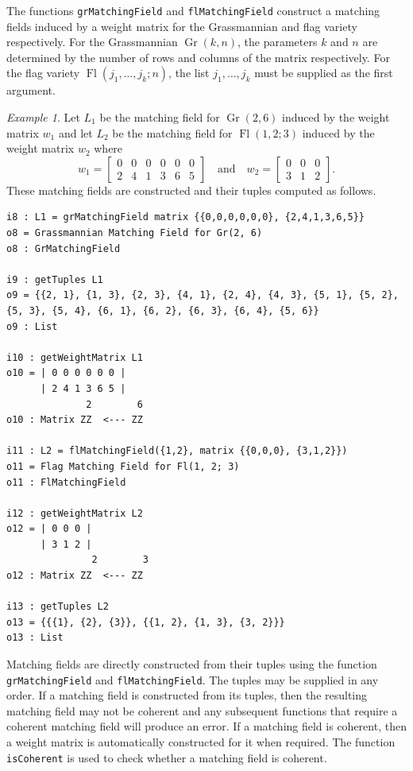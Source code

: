 \documentclass[11pt]{article}
\DeclareMathOperator{\Fl}{Fl}
\DeclareMathOperator{\Gr}{Gr}
\theoremstyle{plain}
\theoremstyle{definition}
\theoremstyle{remark}
\newtheorem{example}[theorem]{Example}
\begin{document}
The functions \texttt{grMatchingField} and \texttt{flMatchingField} construct a matching fields induced by a weight matrix for the Grassmannian and flag variety respectively. For the Grassmannian $\Gr(k,n)$, the parameters $k$ and $n$ are determined by the number of rows and columns of the matrix respectively. For the flag variety $\Fl(j_1, \dots, j_k; n)$, the list $j_1, \dots, j_k$ must be supplied as the first argument.

\begin{example}

Let $L_1$ be the matching field for $\Gr(2, 6)$ induced by the weight matrix $w_1$ and let $L_2$ be the matching field for $\Fl(1,2; 3)$ induced by the weight matrix $w_2$ where
\[
w_1 = 
\begin{bmatrix}
    0 & 0 & 0 & 0 & 0 & 0 \\
    2 & 4 & 1 & 3 & 6 & 5
\end{bmatrix}
\quad \text{and} \quad
w_2 = 
\begin{bmatrix}
    0 & 0 & 0 \\
    3 & 1 & 2
\end{bmatrix}.
\]
These matching fields are constructed and their tuples computed as follows.
\begin{lstlisting}[caption = {Matching fields from weight matrices}]
i8 : L1 = grMatchingField matrix {{0,0,0,0,0,0}, {2,4,1,3,6,5}}
o8 = Grassmannian Matching Field for Gr(2, 6)
o8 : GrMatchingField

i9 : getTuples L1
o9 = {{2, 1}, {1, 3}, {2, 3}, {4, 1}, {2, 4}, {4, 3}, {5, 1}, {5, 2}, {5, 3}, {5, 4}, {6, 1}, {6, 2}, {6, 3}, {6, 4}, {5, 6}}
o9 : List

i10 : getWeightMatrix L1
o10 = | 0 0 0 0 0 0 |
      | 2 4 1 3 6 5 |
              2        6
o10 : Matrix ZZ  <--- ZZ

i11 : L2 = flMatchingField({1,2}, matrix {{0,0,0}, {3,1,2}})
o11 = Flag Matching Field for Fl(1, 2; 3)
o11 : FlMatchingField

i12 : getWeightMatrix L2
o12 = | 0 0 0 |
      | 3 1 2 |
               2        3
o12 : Matrix ZZ  <--- ZZ

i13 : getTuples L2
o13 = {{{1}, {2}, {3}}, {{1, 2}, {1, 3}, {3, 2}}}
o13 : List
\end{lstlisting}
\end{example}



Matching fields are directly constructed from their tuples using the function \texttt{grMatchingField} and \texttt{flMatchingField}. The tuples may be supplied in any order. If a matching field is constructed from its tuples, then the resulting matching field may not be coherent and any subsequent functions that require a coherent matching field will produce an error. If a matching field is coherent, then a weight matrix is automatically constructed for it when required. The function \texttt{isCoherent} is used to check whether a matching field is coherent.
\end{document}
